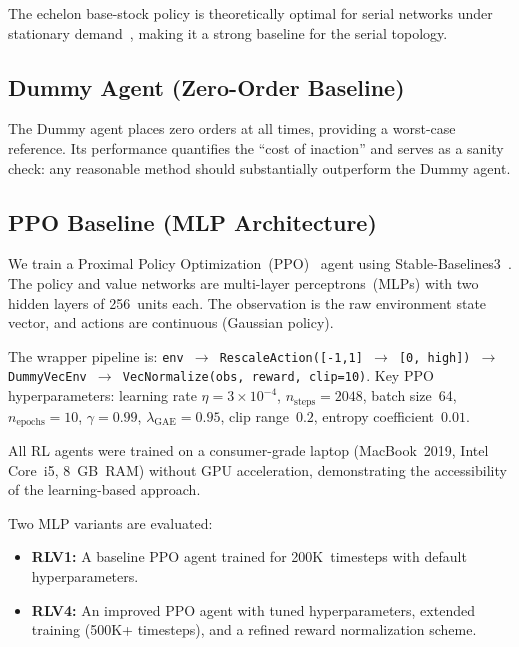The echelon base-stock policy is theoretically optimal for serial
networks under stationary demand~\citep{clark1960optimal}, making it
a strong baseline for the serial topology.

\subsection{Dummy Agent (Zero-Order Baseline)}

The Dummy agent places zero orders at all times, providing a
worst-case reference. Its performance quantifies the ``cost of
inaction'' and serves as a sanity check: any reasonable method should
substantially outperform the Dummy agent.

\subsection{PPO Baseline (MLP Architecture)}\label{sec:ppo_mlp}

We train a Proximal Policy Optimization~(PPO)~\citep{schulman2017proximal}
agent using Stable-Baselines3~\citep{raffin2021stable}. The policy
and value networks are multi-layer perceptrons~(MLPs) with two hidden
layers of 256~units each. The observation is the raw environment state
vector, and actions are continuous (Gaussian policy).

The wrapper pipeline is:
\texttt{env $\to$ RescaleAction([-1,1] $\to$ [0, high]) $\to$
DummyVecEnv $\to$ VecNormalize(obs, reward, clip=10)}. Key PPO
hyperparameters: learning rate $\eta = 3 \times 10^{-4}$,
$n_{\text{steps}} = 2048$, batch size~64, $n_{\text{epochs}} = 10$,
$\gamma = 0.99$, $\lambda_{\text{GAE}} = 0.95$, clip range~$0.2$,
entropy coefficient~$0.01$.

All RL agents were trained on a consumer-grade laptop (MacBook~2019,
Intel Core~i5, 8~GB~RAM) without GPU acceleration, demonstrating the
accessibility of the learning-based approach.

Two MLP variants are evaluated:
\begin{itemize}
  \item \textbf{RLV1:} A baseline PPO agent trained for
        200K~timesteps with default hyperparameters.
  \item \textbf{RLV4:} An improved PPO agent with tuned
        hyperparameters, extended training (500K+ timesteps), and
        a refined reward normalization scheme.
\end{itemize}

